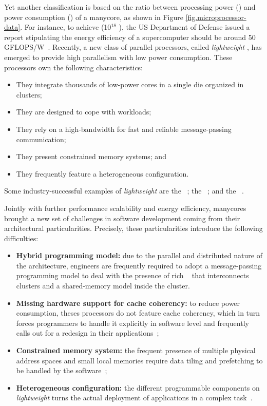 	Yet another classification is based on the ratio between processing power (\flops)
	and power consumption (\watts) of a manycore, as shown in Figure \ref{fig.microprocessor-data}.
	For instance, to achieve \exascale (10$^{18}$ \flops), the US Department of Defense
	issued a report stipulating the energy efficiency of a supercomputer should be
	around 50 GFLOPS/W~\cite{darpa:exascale}.
	Recently, a new class of parallel processors, called \textit{lightweight} \manycores,
	has emerged to provide high parallelism with low power consumption.
	These processors own the following characteristics:

	\begin{itemize}
		\item They integrate thousands of low-power cores in a single die organized in clusters;
		\item They are designed to cope with \mimd workloads;
		\item They rely on a high-bandwidth \noc for fast and reliable message-passing communication;
		\item They present constrained memory systems; and
		\item They frequently feature a heterogeneous configuration.
	\end{itemize}

	Some industry-successful examples of \textit{lightweight} \manycores are
	the \mppa~\cite{DeDinechin2013-1};
	the \epiphany~\cite{olofsson2014}; and
	the \taihulight~\cite{zheng2015}.

	Jointly with further performance scalability and energy efficiency, manycores brought a new
	set of challenges in software development coming from their architectural particularities.
	Precisely, these particularities introduce the following difficulties:
	\begin{itemize}
		\item \textbf{Hybrid programming model:} due to the parallel and distributed nature of
			the architecture, engineers are frequently required to adopt a message-passing
			programming model to deal with the presence of rich \nocs~\cite{kelly2013} that
			interconnects clusters and a shared-memory model inside the cluster.
		\item \textbf{Missing hardware support for cache coherency:} to reduce power consumption,
			theses processors do not feature cache coherency, which in turn forces programmers to
			handle it explicitly in software level and frequently calls out for a redesign in their
			applications~\cite{francesquini2015};
		\item \textbf{Constrained memory system:} the frequent presence of multiple physical
			address spaces and small local memories require data tiling and prefetching to be
			handled by the software~\cite{Castro2016};
		\item \textbf{Heterogeneous configuration:} the different programmable components on
			\textit{lightweight} \manycores turns the actual deployment of applications in a
			complex task~\cite{barbalace2015}.
	\end{itemize}

